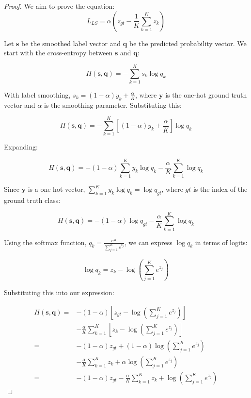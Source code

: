 \begin{proof}

We aim to prove the equation:
\begin{equation}
L_{\textit{LS}}=\alpha (z_{gt} - \frac{1}{K} \sum^{K}_{k = 1} z_k)
\end{equation}

Let $\mathbf{s}$ be the smoothed label vector and $\mathbf{q}$ be the predicted probability vector. We start with the cross-entropy between $\mathbf{s}$ and $\mathbf{q}$:

\begin{equation}
H(\mathbf{s}, \mathbf{q}) = -\sum_{k=1}^{K} s_k \log q_k
\end{equation}

With label smoothing, $s_k = (1 - \alpha) y_k + \frac{\alpha}{K}$, where $\mathbf{y}$ is the one-hot ground truth vector and $\alpha$ is the smoothing parameter. Substituting this:

\begin{equation}
H(\mathbf{s}, \mathbf{q}) = -\sum_{k=1}^{K} [(1 - \alpha) y_k + \frac{\alpha}{K}] \log q_k
\end{equation}

Expanding:

\begin{equation}
H(\mathbf{s}, \mathbf{q}) = -(1 - \alpha)\sum_{k=1}^{K} y_k \log q_k - \frac{\alpha}{K}\sum_{k=1}^{K} \log q_k
\end{equation}

Since $\mathbf{y}$ is a one-hot vector, $\sum_{k=1}^{K} y_k \log q_k = \log q_{gt}$, where $gt$ is the index of the ground truth class:

\begin{equation}
H(\mathbf{s}, \mathbf{q}) = -(1 - \alpha)\log q_{gt} - \frac{\alpha}{K}\sum_{k=1}^{K} \log q_k
\end{equation}

Using the softmax function, $q_k = \frac{e^{z_k}}{\sum_{j=1}^{K} e^{z_j}}$, we can express $\log q_k$ in terms of logits:

\begin{equation}
\log q_k = z_k - \log(\sum_{j=1}^{K} e^{z_j})
\end{equation}

Substituting this into our expression:

\begin{equation}
\begin{split}
H(\mathbf{s}, \mathbf{q}) = &-(1 - \alpha)[z_{gt} - \log(\sum_{j=1}^{K} e^{z_j})] \\
&- \frac{\alpha}{K}\sum_{k=1}^{K} [z_k - \log(\sum_{j=1}^{K} e^{z_j})] \\
= &-(1 - \alpha)z_{gt} + (1 - \alpha)\log(\sum_{j=1}^{K} e^{z_j}) \\
&- \frac{\alpha}{K}\sum_{k=1}^{K} z_k + \alpha\log(\sum_{j=1}^{K} e^{z_j}) \\
= &-(1 - \alpha)z_{gt} - \frac{\alpha}{K}\sum_{k=1}^{K} z_k + \log(\sum_{j=1}^{K} e^{z_j})
\end{split}
\end{equation}



\end{proof}
